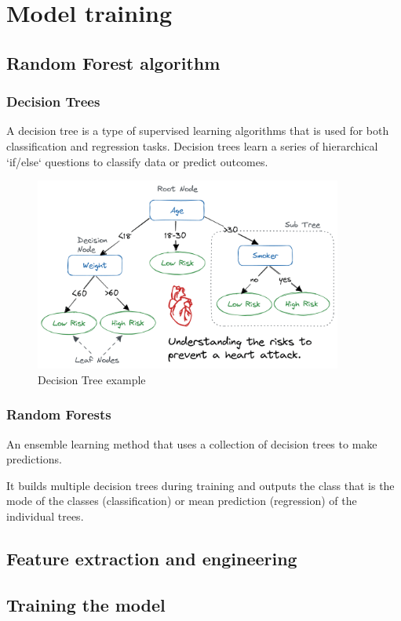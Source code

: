 \chapter{Model training}

\thispagestyle{empty}

\section{Random Forest algorithm}
\subsection{Decision Trees}
A decision tree is a type of supervised learning algorithms that is used for both classification and regression tasks. Decision trees learn a series of hierarchical `if/else` questions to classify data or predict outcomes.
\begin{figure}[h]
	\centering
	\includegraphics[width=0.9\textwidth]{./assets/images/decision_tree-examlpe.png}
	\caption{Decision Tree example}
\end{figure}

\subsection{Random Forests}
An ensemble learning method that uses a collection of decision trees to make predictions.

It builds multiple decision trees during training and outputs the class that is the mode of the classes (classification) or mean prediction (regression) of the individual trees.

\section{Feature extraction and engineering}

\section{Training the model}

